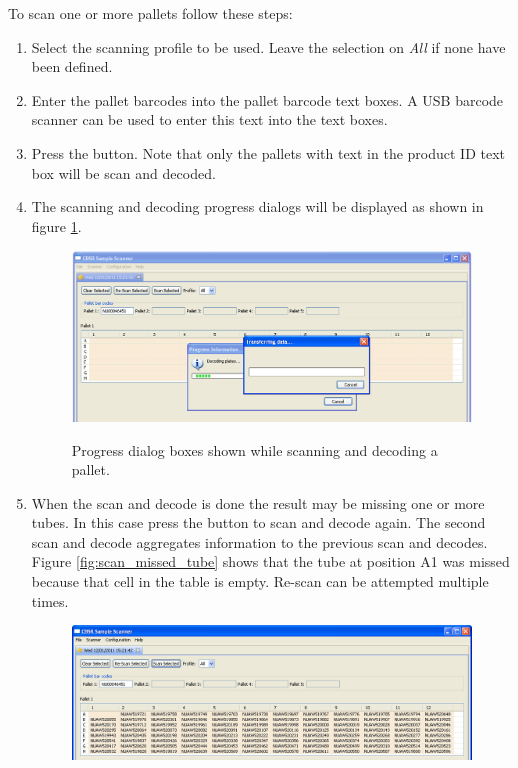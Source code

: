 To scan one or more pallets follow these steps:
\begin{enumerate}
\item Select the scanning profile to be used. Leave the selection on \emph{All}
  if none have been defined.
\item Enter the pallet barcodes into the pallet barcode text boxes. A USB
  barcode scanner can be used to enter this text into the text boxes.
\item Press the  button. Note that only the pallets with
  text in the product ID text box will be scan and decoded.
\item The scanning and decoding progress dialogs will be displayed as shown in
  figure \ref{fig:progress_dialogs}.
\begin{figure}[H]
  \centering
  \scalebox{0.35}
	   { \includegraphics*{screenshots/scan_and_decode/progress_dialogs} }
	   \caption{Progress dialog boxes shown while scanning and decoding a pallet.}
	   \label{fig:progress_dialogs}
\end{figure}
\item When the scan and decode is done the result may be missing one or more
  tubes. In this case press the  button to scan and
  decode again. The second scan and decode aggregates information to the
  previous scan and decodes. Figure \ref{fig:scan_missed_tube} shows that the
  tube at position A1 was missed because that cell in the table is
  empty. Re-scan can be attempted multiple times.
\begin{figure}[H]
  \centering
  \scalebox{0.35}
	   { \includegraphics*{screenshots/scan_and_decode/scan_missed_tube} }

\end{figure}
\end{enumerate}
